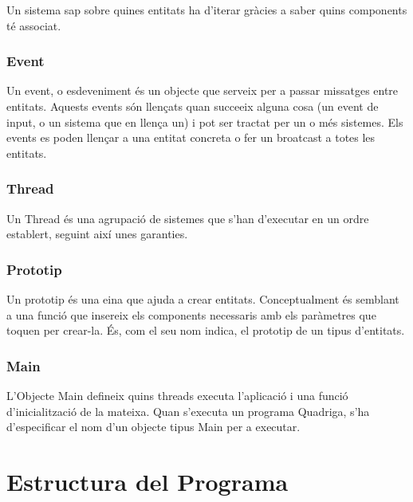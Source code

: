 Un sistema sap sobre quines entitats ha d'iterar gràcies a saber quins components té associat.

\subsubsection{Event}

Un event, o esdeveniment és un objecte que serveix per a passar missatges entre entitats. Aquests events són llençats quan succeeix alguna cosa (un event de input, o un sistema que en llença un) i pot ser tractat per un o més sistemes. Els events es poden llençar a una entitat concreta o fer un broatcast a totes les entitats.

\subsubsection{Thread}

Un Thread és una agrupació de sistemes que s'han d'executar en un ordre establert, seguint així unes garanties.

\subsubsection{Prototip}

Un prototip és una eina que ajuda a crear entitats. Conceptualment és semblant a una funció que insereix els components necessaris amb els paràmetres que toquen per crear-la. És, com el seu nom indica, el prototip de un tipus d'entitats.

\subsubsection{Main}

L'Objecte Main defineix quins threads executa l'aplicació i una funció d'inicialització de la mateixa. Quan s'executa un programa Quadriga, s'ha d'especificar el nom d'un objecte tipus Main per a executar.

\section{Estructura del Programa}

